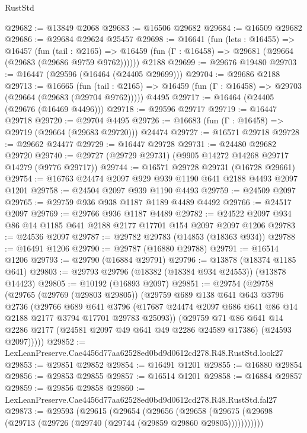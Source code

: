 \begin{lexlean}{RustStd}
\begin{coremodule}
@29682 := @13849 @2068
@29683 := @16506 @29682
@29684 := @16509 @29682
@29686 := @29684 @29624 @25457
@29698 := @16641
    (fun (lets : @16455) =>
    @16457
      (fun (tail : @2165) =>
      @16459 (fun (Γ : @16458) => @29681 (@29664 (@29683 (@29686 @9759 @9762))))))
    @2188
@29699 := @29676 @19480
@29703 := @16447 (@29596 (@16464 (@24405 @29699)))
@29704 := @29686 @2188
@29713 := @16665
    (fun (tail : @2165) => @16459 (fun (Γ : @16458) => @29703 (@29664 (@29683 (@29704 @9762)))))
    @4495
@29717 := @16464 (@24405 (@29676 (@16469 @4496)))
@29718 := @29596 @29717
@29719 := @16447 @29718
@29720 := @29704 @4495
@29726 := @16683 (fun (Γ : @16458) => @29719 (@29664 (@29683 @29720))) @24474
@29727 := @16571 @29718
@29728 := @29662 @24477
@29729 := @16447 @29728
@29731 := @24480 @29682 @29720
@29740 := @29727 (@29729 @29731) (@9905 @14272 @14268 @29717 @14279 (@9776 @29717))
@29744 := @16571 @29728 @29731 (@16728 @29661)
@29754 := @16763 @24474 @2097 @929 @939 @1190 @641 @2188 @4493 @2097 @1201
@29758 := @24504 @2097 @939 @1190 @4493
@29759 := @24509 @2097
@29765 := @29759 @936 @938 @1187 @1189 @4489 @4492
@29766 := @24517 @2097
@29769 := @29766 @936 @1187 @4489
@29782 := @24522 @2097 @934 @86 @14 @1185 @641 @2188 @2177 @17701 @154 @2097 @2097 @1206
@29783 := @24536 @2097
@29787 := @29782 @29783 (@14853 (@18363 @934))
@29788 := @16491 @1206
@29790 := @29787 (@16880 @29788)
@29791 := @16514 @1206
@29793 := @29790 (@16884 @29791)
@29796 := @13878 (@18374 @1185 @641)
@29803 := @29793 @29796 (@18382 (@18384 @934 @24553)) (@13878 @14423)
@29805 := @10192 (@16893 @2097)
@29851 := @29754
    (@29758
      (@29765
        (@29769 (@29803 @29805))
        (@29759
          @689
          @138
          @641
          @643
          @3796
          @2736
          (@29766
            @689
            @641
            @3796
            (@17687 @24474 @2097 @686 @641 @86 @14 @2188 @2177 @3794 @17701 @29783 @25093))
          (@29759
            @71
            @86
            @641
            @14
            @2286
            @2177
            (@24581 @2097 @49 @641 @49 @2286 @24589 @17386)
            (@24593 @2097)))))
@29852 := LexLeanPreserve.Cae4456d77aa62528ed0bd9d0612cd278.R48.RustStd.look27
@29853 := @29851 @29852
@29854 := @16491 @1201
@29855 := @16880 @29854
@29856 := @29853 @29855
@29857 := @16514 @1201
@29858 := @16884 @29857
@29859 := @29856 @29858
@29860 := LexLeanPreserve.Cae4456d77aa62528ed0bd9d0612cd278.R48.RustStd.fal27
@29873 := @29593
    (@29615
      (@29654
        (@29656
          (@29658 (@29675 (@29698 (@29713 (@29726 (@29740 (@29744 (@29859 @29860 @29805)))))))))))

\end{coremodule}
\end{lexlean}

